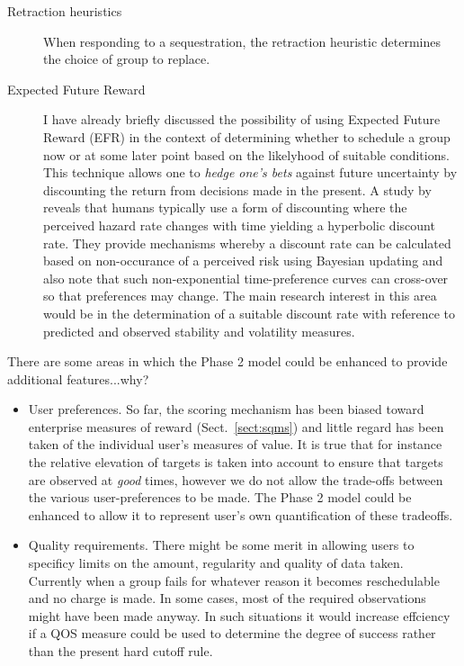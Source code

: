 \begin{description}
 \item [Retraction heuristics]
When responding to a sequestration, the retraction heuristic determines the choice of group to replace.


 \item [Expected Future Reward]
I have already briefly discussed the possibility of using Expected Future Reward (EFR) in the context of determining whether to schedule a group now or at some later point based on the likelyhood of suitable conditions. This technique allows one to \emph{hedge one's bets} against future uncertainty by discounting the return from decisions made in the present. A study by \cite{sozou98hyperbolic} reveals that humans typically use a form of discounting where the perceived hazard rate changes with time yielding a hyperbolic discount rate. They provide mechanisms whereby a discount rate can be calculated based on non-occurance of a perceived risk using Bayesian updating and also note that such non-exponential time-preference curves can cross-over so that preferences may change. The main research interest in this area would be in the determination of a suitable discount rate with reference to predicted and observed stability and volatility measures.

\end{description}


There are some areas in which the Phase 2 model could be enhanced to provide additional features...why?

\begin{itemize}

 \item User preferences. So far, the scoring mechanism has been biased toward enterprise measures of reward (Sect.~\ref{sect:sqms}) and little regard has been taken of the individual user's measures of value. It is true that for instance the relative elevation of targets is taken into account to ensure that targets are observed at \emph{good} times, however we do not allow the trade-offs between the various user-preferences to be made. The Phase 2 model could be enhanced to allow it to represent user's own quantification of these tradeoffs.


 \item Quality requirements. There might be some merit in allowing users to specificy limits on the amount, regularity and quality of data taken. Currently when a group fails for whatever reason it becomes reschedulable and no charge is made. In some cases, most of the required observations might have been made anyway. In such situations it would increase effciency if a QOS measure could be used to determine the degree of success rather than the present hard cutoff rule.


\end{itemize}

